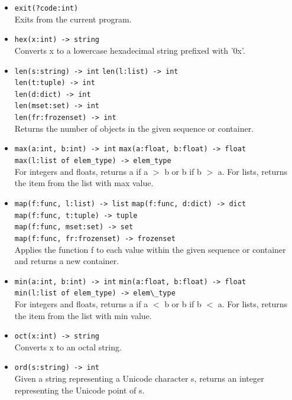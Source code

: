 \documentclass{article}
\begin{document}
\begin{itemize}
\item \verb|exit(?code:int)| \\
    Exits from the current program. 

\item \verb|hex(x:int) -> string| \\
Converts x to a lowercase hexadecimal string prefixed with '0x'.

\item \verb|len(s:string) -> int|
\verb|len(l:list) -> int| \\
\verb|len(t:tuple) -> int| \\
\verb|len(d:dict) -> int| \\
\verb|len(mset:set) -> int| \\
\verb|len(fr:frozenset) -> int| \\
Returns the number of objects in the given sequence or container. 

\item \verb|max(a:int, b:int) -> int|
\verb|max(a:float, b:float) -> float| \\
\verb|max(l:list of elem_type) -> elem_type| \\
For integers and floats, returns a if a $>$ b or b if b $>$ a. For lists, returns the item from the list with max value. 

\item \verb|map(f:func, l:list) -> list|
\verb|map(f:func, d:dict) -> dict| \\
\verb|map(f:func, t:tuple) -> tuple| \\
\verb|map(f:func, mset:set) -> set| \\
\verb|map(f:func, fr:frozenset) -> frozenset| \\
Applies the function f to each value within the given sequence or container and returns a new container.

\item \verb|min(a:int, b:int) -> int|
\verb|min(a:float, b:float) -> float| \\
\verb|min(l:list of elem_type) -> elem\_type| \\
For integers and floats, returns a if a $<$ b or b if b $<$ a. For lists, returns the item from the list with min value. 

\item \verb|oct(x:int) -> string| \\
 Converts x to an octal string. 

\item \verb|ord(s:string) -> int| \\
 Given a string representing a Unicode character s, returns an integer
 representing the Unicode point of s.


\end{itemize}
\end{document}
